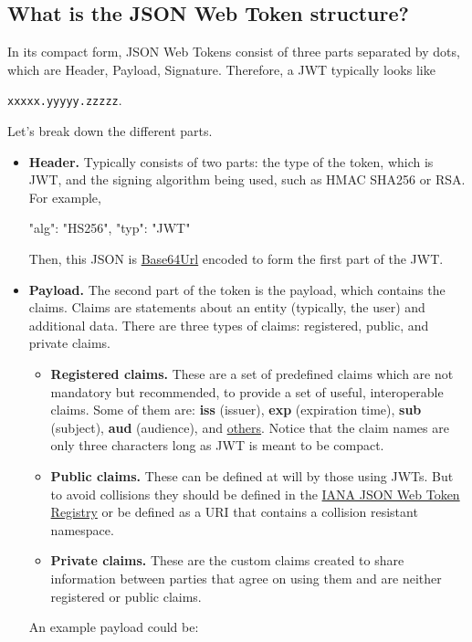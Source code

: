 \subsection{What is the JSON Web Token structure?}\label{subsec:what-is-the-json-web-token-structure?}
In its compact form, JSON Web Tokens consist of three parts separated by dots, which are Header, Payload, Signature.
Therefore, a JWT typically looks like
\begin{center}
    \texttt{xxxxx.yyyyy.zzzzz}.
\end{center}
Let's break down the different parts.
\begin{itemize}
    \item \textbf{Header.} Typically consists of two parts: the type of the token, which is JWT, and the signing algorithm
    being used, such as HMAC SHA256 or RSA\@.
    For example,

    \begin{spverbatim}
    {
        "alg": "HS256",
        "typ": "JWT"
    }
    \end{spverbatim}

    Then, this JSON is \href{https://en.wikipedia.org/wiki/Base64}{Base64Url} encoded to form the first part of the JWT\@.
    \item \textbf{Payload.} The second part of the token is the payload, which contains the claims.
    Claims are statements about an entity (typically, the user) and additional data.
    There are three types of claims: registered, public, and private claims.
    \begin{itemize}
        \item \textbf{Registered claims.} These are a set of predefined claims which are not mandatory but recommended,
        to provide a set of useful, interoperable claims.
        Some of them are: \textbf{iss} (issuer), \textbf{exp} (expiration time), \textbf{sub} (subject),
        \textbf{aud} (audience), and \href{https://tools.ietf.org/html/rfc7519#section-4.1}{others}.
        Notice that the claim names are only three characters long as JWT is meant to be compact.
        \item \textbf{Public claims.} These can be defined at will by those using JWTs. But to avoid collisions they
        should be defined in the \href{https://www.iana.org/assignments/jwt/jwt.xhtml}{IANA JSON Web Token Registry}
        or be defined as a URI that contains a collision resistant namespace.
        \item \textbf{Private claims.} These are the custom claims created to share information between parties that
        agree on using them and are neither registered or public claims.
    \end{itemize}
    An example payload could be:


\end{itemize}
